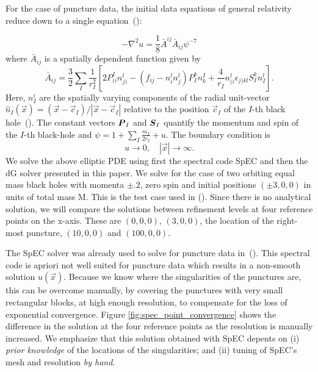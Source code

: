 For the case of puncture data, the initial data equations of general relativity
reduce down to a single equation~(\citet*{brandt1997simple}):

\begin{equation}
\label{eq:Two_Punctures_PDE}
-\nabla^2 u = \frac{1}{8}\bar A^{ij} \bar A_{ij}\psi^{-7}
\end{equation}
%
where $\bar A_{ij}$ is a spatially dependent function given by
%
\begin{equation}
  \label{eq:Two_Punctures_Aij}
\bar{A}_{ij} = \frac{3}{2}\sum_{I}\frac{1}{r^{2}_{I}}[2P^{I}_{(i}n^{l}_{j)}-(f_{ij}-n^{l}_{i}n^l_j)P^{k}_{I}n^I_k + \frac{4}{r_{I}}n^l_{(i}\epsilon_{j)kl}S^k_In^l_I].
\end{equation}
%
Here, $n^i_I$ are the spatially varying components of the radial unit-vector $\hat n_{I}(\vec x)=(\vec{x}-\vec c_{I})/|\vec x-\vec c_I|$ relative to the position $\vec c_I$ of the $I$-th black hole~(\citet*{brandt1997simple}). The constant vectors $\boldsymbol{P}_{I}$ and $\boldsymbol{S}_{I}$
quantify the momentum and spin of the $I$-th black-hole and $\psi = 1 + \sum_I \frac{m_{I}}{2r_{I}}+u$. The boundary condition is
%
\begin{equation}
  u\to 0,\quad |\vec x| \to \infty.
\end{equation}
%
We solve the above elliptic PDE using first the spectral code SpEC and
then the dG solver presented in this paper. We solve for the case of
two orbiting equal mass black holes with momenta $\pm .2$, zero spin
and initial positions $(\pm 3, 0, 0)$ in units of total mass M. This
is the test case used in (\citet*{ansorg2007}). Since there is no
analytical solution, we will compare the solutions between refinement
levels at four reference points on the x-axis. These are $(0,0,0)$,
$(3,0,0)$, the location of the right-most puncture, $(10,0,0)$ and
$(100,0,0)$.

The SpEC solver was already used to solve for puncture data
in~(\citet*{dennison2006,lovelace2008}).  This spectral code is apriori
not well suited for puncture data which results in a non-smooth
solution $u(\vec x)$.  Because we know where the singularities of the
punctures are, this can be overcome manually, by covering the
punctures with very small rectangular blocks, at high enough
resolution, to compensate for the loss of exponential
convergence. Figure \ref{fig:spec_point_convergence} shows the
difference in the solution at the four reference points as the
resolution is manually increased. We emphasize that this
  solution obtained with SpEC depents on (i) \textit{prior knowledge}
  of the locations of the singularities; and (ii) tuning of SpEC's
  mesh and resolution \textit{by hand}.

